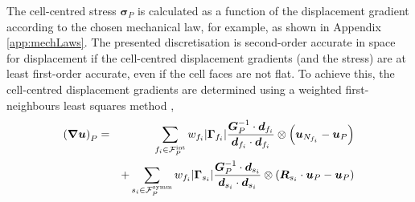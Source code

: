 \documentclass[sn-mathphys,Numbered]{sn-jnl}%
\newcommand{\bb}{\boldsymbol}
\begin{document}
The cell-centred stress $\bb{\sigma}_P$ is calculated as a function of the displacement gradient according to the chosen mechanical law, for example, as shown in Appendix \ref{app:mechLaws}.
The presented discretisation is second-order accurate in space for displacement if the cell-centred displacement gradients (and the stress) are at least first-order accurate, even if the cell faces are not flat.
To achieve this, the cell-centred displacement gradients are determined using a weighted first-neighbours least squares method \citep{Jasak1996},
\begin{eqnarray} \label{eq:leastSquaresGrad}
	\left(\bb{\nabla}\bb{u}\right)_P
		&=&\sum_{f_i \in \mathcal{F}^{\text{int}}_P} w_{f_i} |\bb{\Gamma}_{f_i}| \frac{\bb{G}^{-1}_P \cdot \bb{d}_{f_i}}{\bb{d}_{f_i} \cdot \bb{d}_{f_i}}  \otimes \left(\bb{u}_{N_{f_i}} - \bb{u}_P \right) \notag \\
		&&+ \sum_{s_i \in \mathcal{F}^{\text{symm}}_P} w_{f_i} |\bb{\Gamma}_{s_i}| \frac{\bb{G}^{-1}_P \cdot \bb{d}_{s_i}}{\bb{d}_{s_i} \cdot \bb{d}_{s_i}} \otimes \left(\bb{R}_{s_i} \cdot \bb{u}_P - \bb{u}_P \right)
\end{eqnarray}
\end{document}
